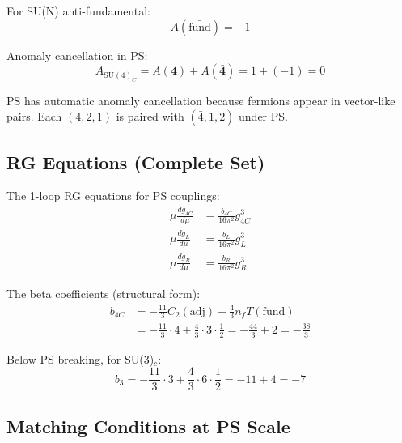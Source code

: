 \documentclass[11pt,a4paper]{article}
\theoremstyle{definition}
\begin{document}
For SU(N) anti-fundamental:
\begin{equation}
  \label{eq:anomaly-antifund}
  A(\bar{\text{fund}}) = -1
\end{equation}

Anomaly cancellation in PS:
\begin{equation}
  \label{eq:anomaly-cancel-ps}
  A_{\text{SU}(4)_C} = A(\mathbf{4}) + A(\bar{\mathbf{4}}) = 1 + (-1) = 0
\end{equation}

\begin{trapbox}
PS has automatic anomaly cancellation because fermions appear in vector-like pairs.
Each $(4, 2, 1)$ is paired with $(\bar{4}, 1, 2)$ under PS.
\end{trapbox}

\subsection{RG Equations (Complete Set)}
\label{subsec:rg-complete}

The 1-loop RG equations for PS couplings:
\begin{align}
  \label{eq:rg-g4c}
  \mu \frac{dg_{4C}}{d\mu} &= \frac{b_{4C}}{16\pi^2} g_{4C}^3 \\
  \label{eq:rg-gl}
  \mu \frac{dg_L}{d\mu} &= \frac{b_L}{16\pi^2} g_L^3 \\
  \label{eq:rg-gr}
  \mu \frac{dg_R}{d\mu} &= \frac{b_R}{16\pi^2} g_R^3
\end{align}

The beta coefficients (structural form):
\begin{align}
  \label{eq:beta-4c}
  b_{4C} &= -\frac{11}{3} C_2(\text{adj}) + \frac{4}{3} n_f T(\text{fund}) \\
  \label{eq:beta-4c-value}
  &= -\frac{11}{3} \cdot 4 + \frac{4}{3} \cdot 3 \cdot \frac{1}{2} = -\frac{44}{3} + 2 = -\frac{38}{3}
\end{align}

Below PS breaking, for SU(3)$_c$:
\begin{equation}
  \label{eq:beta-3-value}
  b_3 = -\frac{11}{3} \cdot 3 + \frac{4}{3} \cdot 6 \cdot \frac{1}{2} = -11 + 4 = -7
\end{equation}

\subsection{Matching Conditions at PS Scale}
\label{subsec:matching-ps}
\end{document}
